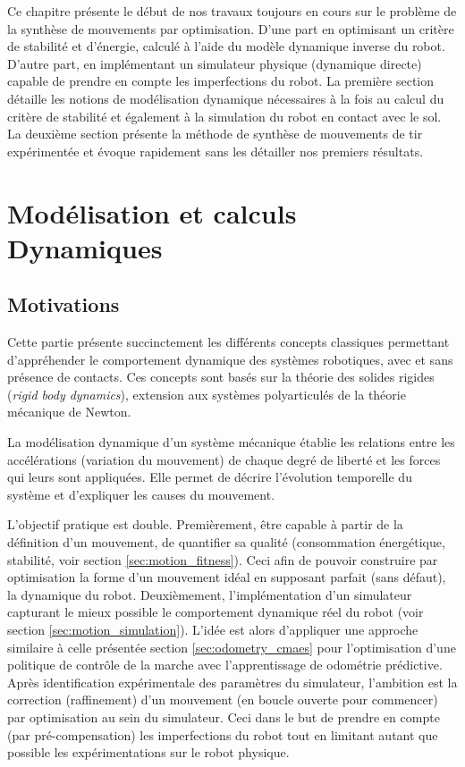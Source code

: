 
Ce chapitre présente le début de nos travaux toujours en cours 
sur le problème de la synthèse de mouvements par optimisation.
D'une part en optimisant un critère de stabilité et d'énergie, 
calculé à l'aide du modèle dynamique inverse du robot.
D'autre part, en implémentant un simulateur physique (dynamique directe) 
capable de prendre en compte les imperfections du robot.
La première section détaille les notions de modélisation
dynamique nécessaires à la fois au calcul du critère de stabilité 
et également à la simulation du robot en contact avec le sol.
La deuxième section présente la méthode de synthèse de mouvements
de tir expérimentée et évoque rapidement sans les détailler 
nos premiers résultats.

\section{Modélisation et calculs Dynamiques\label{sec:model_dynamics}}

\subsection{Motivations}

Cette partie présente succinctement les différents
concepts classiques permettant d'appréhender le comportement
dynamique des systèmes robotiques, avec et sans présence de contacts.
Ces concepts sont basés sur la théorie des solides rigides
(\textit{rigid body dynamics}),
extension aux systèmes polyarticulés de la théorie mécanique de Newton.

La modélisation dynamique d'un système mécanique
établie les relations entre les accélérations (variation du mouvement) 
de chaque degré de liberté et les forces qui leurs sont appliquées.
Elle permet de décrire l'évolution temporelle
du système et d'expliquer les causes du mouvement.

L'objectif pratique est double. 
Premièrement, être capable à partir de la définition d'un mouvement,
de quantifier sa qualité (consommation énergétique, stabilité, 
voir section \ref{sec:motion_fitness}).
Ceci afin de pouvoir construire par optimisation la forme d'un mouvement
idéal en supposant \og parfait \fg (sans défaut), la dynamique du robot.
Deuxièmement, l'implémentation d'un simulateur
capturant le mieux possible le comportement dynamique réel du robot 
(voir section \ref{sec:motion_simulation}).
L'idée est alors d'appliquer une approche similaire à celle présentée
section \ref{sec:odometry_cmaes} pour l'optimisation d'une politique de contrôle
de la marche avec l'apprentissage de odométrie prédictive.
Après identification expérimentale des paramètres du simulateur,
l'ambition est la correction (raffinement) d'un mouvement (en boucle ouverte pour commencer)
par optimisation au sein du simulateur.
Ceci dans le but de prendre en compte 
(par pré-compensation) les imperfections du robot tout en limitant 
autant que possible les expérimentations sur le robot physique.

